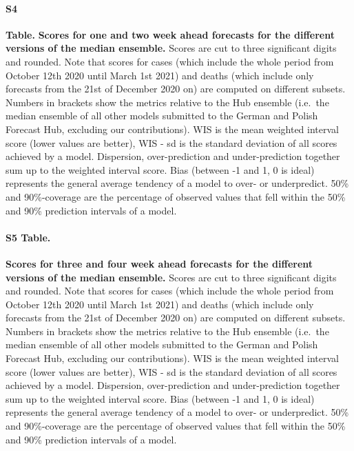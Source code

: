 \documentclass[10pt,letterpaper]{article}
\begin{document}
\paragraph{S4}

\textbf{Table.} \label{tab:score-table-ensemble-2}
\textbf{Scores for one and two week ahead forecasts for the different versions of the median ensemble.}
Scores are cut to three significant digits and rounded. Note that scores
for cases (which include the whole period from October 12th 2020 until
March 1st 2021) and deaths (which include only forecasts from the 21st
of December 2020 on) are computed on different subsets. Numbers in
brackets show the metrics relative to the Hub ensemble (i.e.~the median
ensemble of all other models submitted to the German and Polish Forecast
Hub, excluding our contributions). WIS is the mean weighted interval
score (lower values are better), WIS - sd is the standard deviation of
all scores achieved by a model. Dispersion, over-prediction and
under-prediction together sum up to the weighted interval score. Bias
(between -1 and 1, 0 is ideal) represents the general average tendency
of a model to over- or underpredict. 50\% and 90\%-coverage are the
percentage of observed values that fell within the 50\% and 90\%
prediction intervals of a model.

\paragraph{S5 Table.}
\label{tab:score-table-ensemble-4}

\textbf{Scores for three and four week ahead forecasts for the different versions of the median ensemble.}
Scores are cut to three significant digits and rounded. Note that scores
for cases (which include the whole period from October 12th 2020 until
March 1st 2021) and deaths (which include only forecasts from the 21st
of December 2020 on) are computed on different subsets. Numbers in
brackets show the metrics relative to the Hub ensemble (i.e.~the median
ensemble of all other models submitted to the German and Polish Forecast
Hub, excluding our contributions). WIS is the mean weighted interval
score (lower values are better), WIS - sd is the standard deviation of
all scores achieved by a model. Dispersion, over-prediction and
under-prediction together sum up to the weighted interval score. Bias
(between -1 and 1, 0 is ideal) represents the general average tendency
of a model to over- or underpredict. 50\% and 90\%-coverage are the
percentage of observed values that fell within the 50\% and 90\%
prediction intervals of a model.
\end{document}
